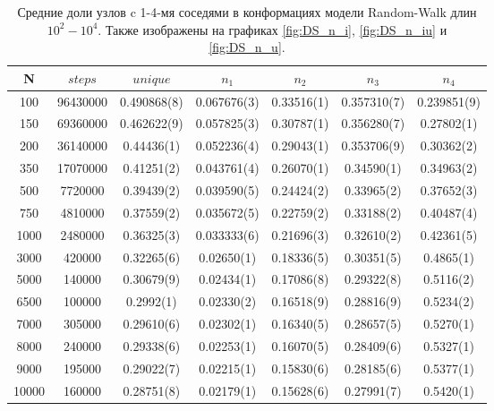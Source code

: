 \begin{table}[h]
    \centering

\begin{tabular}{|c|c|c|c|c|c|c|}
\hline
N & $steps$ & $unique$ & $n_{1}$ & $n_{2}$ & $n_{3}$ & $n_{4}$ \\ \hline
100 & 96430000 & 0.490868(8) & 0.067676(3) & 0.33516(1) & 0.357310(7) & 0.239851(9) \\ \hline
150 & 69360000 & 0.462622(9) & 0.057825(3) & 0.30787(1) & 0.356280(7) & 0.27802(1) \\ \hline
200 & 36140000 & 0.44436(1) & 0.052236(4) & 0.29043(1) & 0.353706(9) & 0.30362(2) \\ \hline
350 & 17070000 & 0.41251(2) & 0.043761(4) & 0.26070(1) & 0.34590(1) & 0.34963(2) \\ \hline
500 & 7720000 & 0.39439(2) & 0.039590(5) & 0.24424(2) & 0.33965(2) & 0.37652(3) \\ \hline
750 & 4810000 & 0.37559(2) & 0.035672(5) & 0.22759(2) & 0.33188(2) & 0.40487(4) \\ \hline 
1000 & 2480000 & 0.36325(3) & 0.033333(6) & 0.21696(3) & 0.32610(2) & 0.42361(5) \\ \hline
3000 & 420000 & 0.32265(6) & 0.02650(1) & 0.18336(5) & 0.30351(5) & 0.4865(1) \\ \hline
5000 & 140000 & 0.30679(9) & 0.02434(1) & 0.17086(8) & 0.29322(8) & 0.5116(2) \\ \hline
6500 & 100000 & 0.2992(1) & 0.02330(2) & 0.16518(9) & 0.28816(9) & 0.5234(2) \\ \hline
7000 & 305000 & 0.29610(6) & 0.02302(1) & 0.16340(5) & 0.28657(5) & 0.5270(1) \\ \hline
8000 & 240000 & 0.29338(6) & 0.02253(1) & 0.16070(5) & 0.28409(6) & 0.5327(1) \\ \hline
9000 & 195000 & 0.29022(7) & 0.02215(1) & 0.15830(6) & 0.28185(6) & 0.5377(1) \\ \hline
10000 & 160000 & 0.28751(8) & 0.02179(1) & 0.15628(6) & 0.27991(7) & 0.5420(1) \\ \hline
\end{tabular}

    \caption{Средние доли узлов c 1-4-мя соседями в конформациях модели Random-Walk длин $10^{2}-10^{4}$. Также изображены на графиках \ref{fig:DS_n_i}, \ref{fig:DS_n_iu} и \ref{fig:DS_n_u}.}
    \label{tab:Ran_Walk_neigh}
\end{table}

